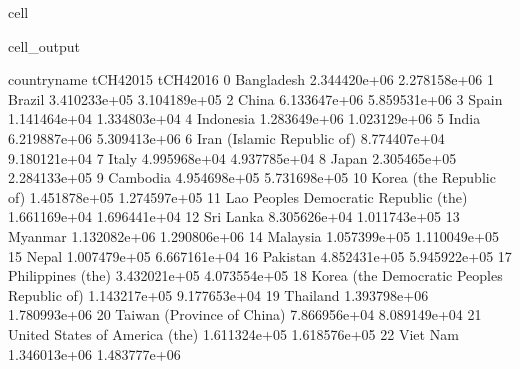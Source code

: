 \documentclass[letterpaper,10pt,english]{jupyterBook}
\begin{document}
\begin{sphinxuseclass}{cell}
\begin{sphinxVerbatimOutput}
\begin{sphinxuseclass}{cell_output}
\begin{sphinxVerbatim}[commandchars=\\\{\}]
                                   country\PYGZus{}name     tCH4\PYGZus{}2015     tCH4\PYGZus{}2016  \PYGZbs{}
0                                    Bangladesh  2.344420e+06  2.278158e+06   
1                                        Brazil  3.410233e+05  3.104189e+05   
2                                         China  6.133647e+06  5.859531e+06   
3                                         Spain  1.141464e+04  1.334803e+04   
4                                     Indonesia  1.283649e+06  1.023129e+06   
5                                         India  6.219887e+06  5.309413e+06   
6                    Iran (Islamic Republic of)  8.774407e+04  9.180121e+04   
7                                         Italy  4.995968e+04  4.937785e+04   
8                                         Japan  2.305465e+05  2.284133e+05   
9                                      Cambodia  4.954698e+05  5.731698e+05   
10                      Korea (the Republic of)  1.451878e+05  1.274597e+05   
11       Lao People\PYGZsq{}s Democratic Republic (the)  1.661169e+04  1.696441e+04   
12                                    Sri Lanka  8.305626e+04  1.011743e+05   
13                                      Myanmar  1.132082e+06  1.290806e+06   
14                                     Malaysia  1.057399e+05  1.110049e+05   
15                                        Nepal  1.007479e+05  6.667161e+04   
16                                     Pakistan  4.852431e+05  5.945922e+05   
17                            Philippines (the)  3.432021e+05  4.073554e+05   
18  Korea (the Democratic People\PYGZsq{}s Republic of)  1.143217e+05  9.177653e+04   
19                                     Thailand  1.393798e+06  1.780993e+06   
20                   Taiwan (Province of China)  7.866956e+04  8.089149e+04   
21               United States of America (the)  1.611324e+05  1.618576e+05   
22                                     Viet Nam  1.346013e+06  1.483777e+06   


\end{sphinxVerbatim}
\end{sphinxuseclass}
\end{sphinxVerbatimOutput}
\end{sphinxuseclass}
\end{document}
